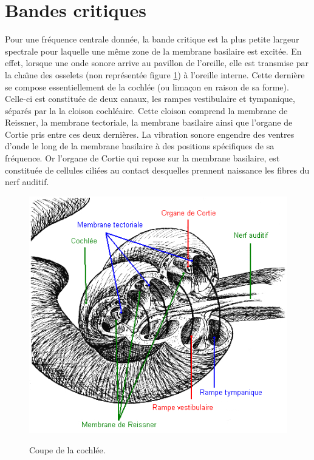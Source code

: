 \section{Bandes critiques}
Pour une fr{\'e}quence centrale donn{\'e}e, la bande critique est la plus
petite largeur spectrale pour laquelle une m{\^e}me zone de la
membrane basilaire est excit{\'e}e. En effet, lorsque une onde sonore
arrive au pavillon de l'oreille, elle est transmise par la cha{\^\i}ne
des osselets (non repr{\'e}sent{\'e}e figure \ref{cochlee}) {\`a} l'oreille
interne. Cette derni{\`e}re se compose essentiellement de la cochl{\'e}e
(ou lima\c{c}on en raison de sa forme). Celle-ci est constitu{\'e}e de
deux canaux, les rampes vestibulaire et tympanique, s{\'e}par{\'e}s par la
la cloison cochl{\'e}aire. Cette cloison comprend la membrane de
Reissner, la membrane tectoriale, la membrane basilaire ainsi que
l'organe de Cortie pris entre ces deux derni{\`e}res. La vibration
sonore engendre des ventres d'onde le long de la membrane
basilaire {\`a} des positions sp{\'e}cifiques de sa fr{\'e}quence. Or l'organe
de Cortie qui repose sur la membrane basilaire, est constitu{\'e}e de
cellules cili{\'e}es au contact desquelles prennent naissance les
fibres du nerf auditif.\\

\begin{figure}[h]
    \bigskip
    \centering
    \includegraphics[width=12cm]{figures/cochlee.png}\\
    \caption{Coupe de la cochl{\'e}e.}
    \label{cochlee}
    \bigskip
\end{figure}

